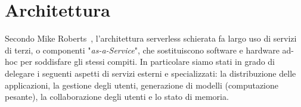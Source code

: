 \section{Architettura}
\label{sec:chapter_2_section_5}

Secondo Mike Roberts~\cite{Roberts}, l'architettura serverless schierata fa largo uso di servizi di terzi,
o componenti "\emph{as-a-Service}", che sostituiscono software e hardware ad-hoc per soddisfare gli stessi compiti.
In particolare siamo stati in grado di delegare i seguenti aspetti di servizi esterni e specializzati:
la distribuzione delle applicazioni, la gestione degli utenti, generazione di modelli (computazione pesante),
la collaborazione degli utenti e lo stato di memoria.


